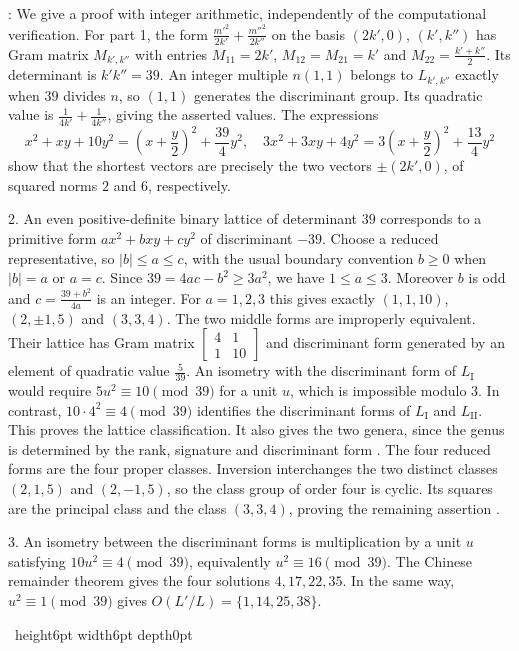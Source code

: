 \documentclass[leqno]{article}
\renewcommand{\leq}{\ensuremath{\leqslant}}
\renewcommand{\geq}{\ensuremath{\geqslant}}
\newcommand{\qed}{\hfill \vrule height6pt  width6pt depth0pt}
\newenvironment{proof}[1][]{\noindent {\it Proof #1} : }{\hbox{~}\qed
\smallskip
}
\numberwithin{equation}{section}
\begin{document}
\begin{proof}
We give a proof with integer arithmetic, independently of the computational verification. For part 1, the form $\frac{m'^2}{2k'}+\frac{m''^2}{2k''}$ on the basis $(2k',0)$, $(k',k'')$ has Gram matrix $M_{k',k''}$ with entries $M_{11} = 2k'$, $M_{12} = M_{21} = k'$ and $M_{22} = \frac{k'+k''}{2}$. Its determinant is $k'k'' = 39$. An integer multiple $n(1,1)$ belongs to $L_{k',k''}$ exactly when $39$ divides $n$, so $(1,1)$ generates the discriminant group. Its quadratic value is $\frac1{4k'}+\frac1{4k''}$, giving the asserted values. The expressions
\[
x^2+xy+10y^2 = \left(x+\frac y2\right)^2+\frac{39}{4}y^2,
\quad
3x^2+3xy+4y^2 = 3\left(x+\frac y2\right)^2+\frac{13}{4}y^2
\]
show that the shortest vectors are precisely the two vectors $\pm(2k',0)$, of squared norms $2$ and $6$, respectively.

2. An even positive-definite binary lattice of determinant $39$ corresponds to a primitive form $ax^2+bxy+cy^2$ of discriminant $-39$. Choose a reduced representative, so $|b| \leq a \leq c$, with the usual boundary convention $b \geq 0$ when $|b| = a$ or $a = c$. Since $39 = 4ac-b^2 \geq 3a^2$, we have $1 \leq a \leq 3$. Moreover $b$ is odd and $c = \frac{39+b^2}{4a}$ is an integer. For $a = 1,2,3$ this gives exactly $(1,1,10)$, $(2,\pm1,5)$ and $(3,3,4)$. The two middle forms are improperly equivalent. Their lattice has Gram matrix $\left[\begin{smallmatrix}4&1\\1&10\end{smallmatrix}\right]$ and discriminant form generated by an element of quadratic value $\frac5{39}$. An isometry with the discriminant form of $L_{\mathrm I}$ would require $5u^2 \equiv 10 \pmod {39}$ for a unit $u$, which is impossible modulo $3$. In contrast, $10\cdot4^2 \equiv 4 \pmod {39}$ identifies the discriminant forms of $L_{\mathrm I}$ and $L_{\mathrm{II}}$. This proves the lattice classification. It also gives the two genera, since the genus is determined by the rank, signature and discriminant form \cite[Corollary 1.9.4]{Nik80}. The four reduced forms are the four proper classes. Inversion interchanges the two distinct classes $(2,1,5)$ and $(2,-1,5)$, so the class group of order four is cyclic. Its squares are the principal class and the class $(3,3,4)$, proving the remaining assertion \cite{Cox13}.

3. An isometry between the discriminant forms is multiplication by a unit $u$ satisfying $10u^2 \equiv 4 \pmod {39}$, equivalently $u^2 \equiv 16 \pmod {39}$. The Chinese remainder theorem gives the four solutions $4,17,22,35$. In the same way, $u^2 \equiv 1 \pmod {39}$ gives $O(L'/L) = \{1,14,25,38\}$.


\end{proof}
\end{document}
